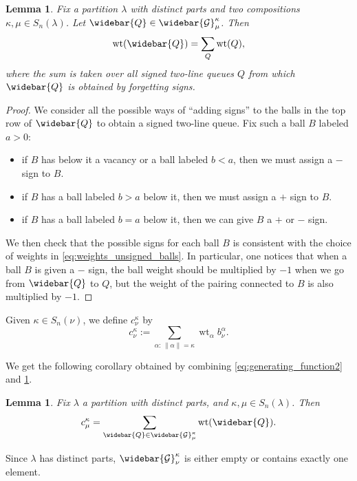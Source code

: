\documentclass[12pt]{amsart}
\newtheorem{lem}[thm]{Lemma}
\theoremstyle{definition}
\DeclareMathOperator{\wt}{wt}
\newcommand{\Gbar}{\widebar{\mathcal{G}}}
\newcommand{\Qbar}{\widebar{Q}}
\newcommand{\tb}{c}
\begin{document}
 
 \begin{lem}\label{lem:forget_signs}
 Fix a partition $\lambda$ with distinct parts and two compositions $\kappa,\mu\in S_n(\lambda)$. Let $\Qbar\in \Gbar^{\kappa}_\mu$. Then
 $$\wt(\Qbar)=\sum_{Q}\wt(Q),$$
where the sum is taken over all signed two-line queues $Q$ from which $\Qbar$ is obtained by forgetting signs.
 \end{lem}
\begin{proof}
    We consider all the possible ways of ``adding signs'' to the balls in the top row of $\Qbar$ to obtain a signed two-line queue. Fix such a ball $B$ labeled $a>0$:
    \begin{itemize}
        \item if $B$ has below it a vacancy or a ball labeled $b<a$, then 
        we must assign a $-$ sign to $B$. 
        \item if $B$ has a ball labeled $b>a$ below it, then 
        we must assign a $+$ sign to $B$.
        \item if $B$ has a ball labeled $b=a$ below it, then %
        we can give $B$ a $+$ or $-$ sign.
    \end{itemize}
We then check that the possible signs for each ball $B$ is consistent with the choice of weights in \cref{eq:weights_unsigned_balls}. In particular, one notices that when a ball $B$ is given a $-$ sign, the ball weight should be multiplied by $-1$ when we go from $\Qbar$ to $Q$, but the weight of the pairing connected to $B$ is also multiplied by $-1$.
\end{proof}

Given $\kappa\in S_n(\nu)$, we define $\tb_\nu^{\kappa}$ by 
\begin{equation}\label{eq:def_c}
  \tb_{\nu}^{\kappa}:=\sum_{\alpha:\, \lVert \alpha\rVert =\kappa}\wt_\alpha b^{\alpha}_{\nu}.  
\end{equation}


 We get the following corollary obtained by combining \cref{eq:generating_function2} and \cref{lem:forget_signs}.
\begin{lem}\label{lem:c}
 Fix $\lambda$ a partition with distinct parts, and $\kappa,\mu\in S_n(\lambda)$. Then
 $$c^\kappa_\mu=\sum_{\Qbar\in \Gbar^{\kappa}_\mu} \wt(\Qbar).$$
\end{lem}
    Since $\lambda$ has distinct parts, $\Gbar^{\kappa}_\nu$ is either empty or contains exactly one element.
\end{document}
